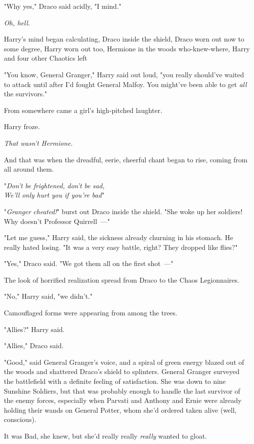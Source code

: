 "Why yes," Draco said acidly, "I mind."

\emph{Oh, hell.}

Harry's mind began calculating, Draco inside the shield, Draco worn out now to
some degree, Harry worn out too, Hermione in the woods who-knew-where, Harry
and four other Chaotics left{\el}

"You know, General Granger," Harry said out loud, "you really should've waited
to attack until after I'd fought General Malfoy. You might've been able to get
\emph{all} the survivors."

From somewhere came a girl's high-pitched laughter.

Harry froze.

\emph{That wasn't Hermione.}

And that was when the dreadful, eerie, cheerful chant began to rise, coming
from all around them.

"\emph{Don't be frightened, don't be sad,\\
We'll only hurt you if you're bad{\el}}"

"\emph{Granger cheated!}" burst out Draco inside the shield. "She woke up her
soldiers! Why doesn't Professor Quirrell~---"

"Let me guess," Harry said, the sickness already churning in his stomach. He
really hated losing. "It was a very easy battle, right? They dropped like
flies?"

"Yes," Draco said. "We got them all on the first shot~---"

The look of horrified realization spread from Draco to the Chaos Legionnaires.

"No," Harry said, "we didn't."

Camouflaged forms were appearing from among the trees.

"Allies?" Harry said.

"Allies," Draco said.

"Good," said General Granger's voice, and a spiral of green energy blazed out
of the woods and shattered Draco's shield to splinters.
\sbreak
General Granger surveyed the battlefield with a definite feeling of
satisfaction. She was down to nine Sunshine Soldiers, but that was probably
enough to handle the last survivor of the enemy forces, especially when Parvati
and Anthony and Ernie were already holding their wands on General Potter, whom
she'd ordered taken alive (well, conscious).

It was Bad, she knew, but she'd really really \emph{really} wanted to gloat.

